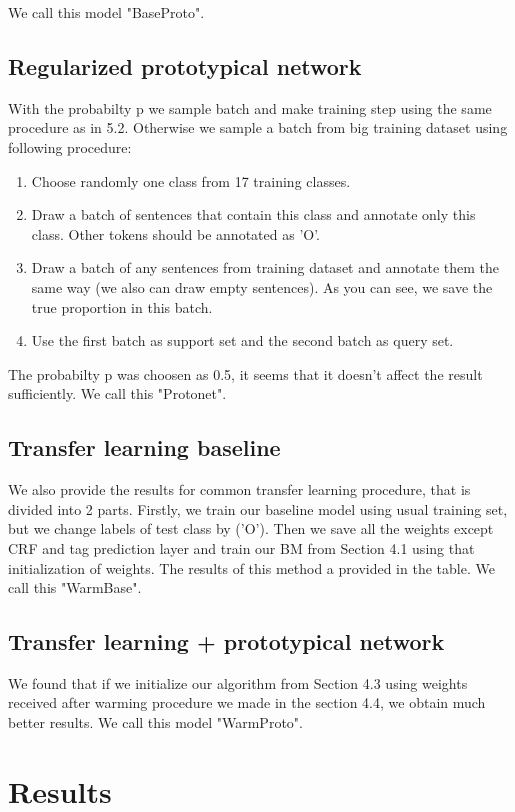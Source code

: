 We call this model "BaseProto".

\subsection{Regularized prototypical network}

With the probabilty p we sample batch and make training step using the same procedure as in 5.2. Otherwise we sample a batch from big training dataset using following procedure:
\begin{enumerate}
  \item Choose randomly one class from 17 training classes.
  \item Draw a batch of sentences that contain this class and annotate only this class. Other tokens should be annotated as 'O'.
  \item Draw a batch of any sentences from training dataset and annotate them the same way (we also can draw empty sentences). As you can see, we save the true proportion in this batch.
  \item Use the first batch as support set and the second batch as query set.
\end{enumerate}
The probabilty p was choosen as 0.5, it seems that it doesn't affect the result sufficiently.
We call this "Protonet".

\subsection{Transfer learning baseline}

We also provide the results for common transfer learning procedure, that is divided into 2 parts. 
Firstly, we train our baseline model using usual training set, but we change labels of test class by ('O'). 
Then we save all the weights except CRF and tag prediction layer and train our BM from Section 4.1 using that initialization of weights.
The results of this method a provided in the table.
We call this "WarmBase".

\subsection{Transfer learning + prototypical network}

We found that if we initialize our algorithm from Section 4.3 using weights received after warming procedure we made in the section 4.4, we obtain much better results.
We call this model "WarmProto".

\section{Results}
